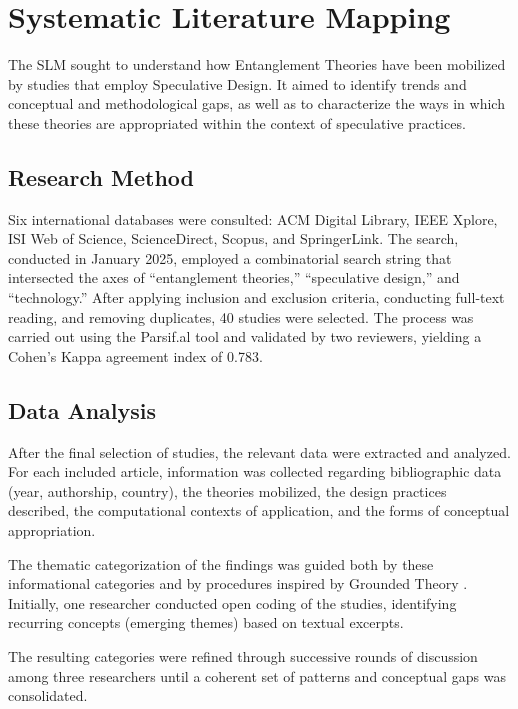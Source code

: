 \section{Systematic Literature Mapping}

The SLM sought to understand how Entanglement Theories have been mobilized by studies that employ Speculative Design. It aimed to identify trends and conceptual and methodological gaps, as well as to characterize the ways in which these theories are appropriated within the context of speculative practices.

\subsection{Research Method}

Six international databases were consulted: ACM Digital Library, IEEE Xplore, ISI Web of Science, ScienceDirect, Scopus, and SpringerLink. The search, conducted in January 2025, employed a combinatorial search string that intersected the axes of ``entanglement theories,'' ``speculative design,'' and ``technology.'' After applying inclusion and exclusion criteria, conducting full-text reading, and removing duplicates, 40 studies were selected. The process was carried out using the Parsif.al tool and validated by two reviewers, yielding a Cohen’s Kappa agreement index of 0.783.

\subsection{Data Analysis}

After the final selection of studies, the relevant data were extracted and analyzed. For each included article, information was collected regarding bibliographic data (year, authorship, country), the theories mobilized, the design practices described, the computational contexts of application, and the forms of conceptual appropriation.

The thematic categorization of the findings was guided both by these informational categories and by procedures inspired by Grounded Theory \cite{noble2016grounded}. Initially, one researcher conducted open coding of the studies, identifying recurring concepts (emerging themes) based on textual excerpts.

The resulting categories were refined through successive rounds of discussion among three researchers until a coherent set of patterns and conceptual gaps was consolidated.


